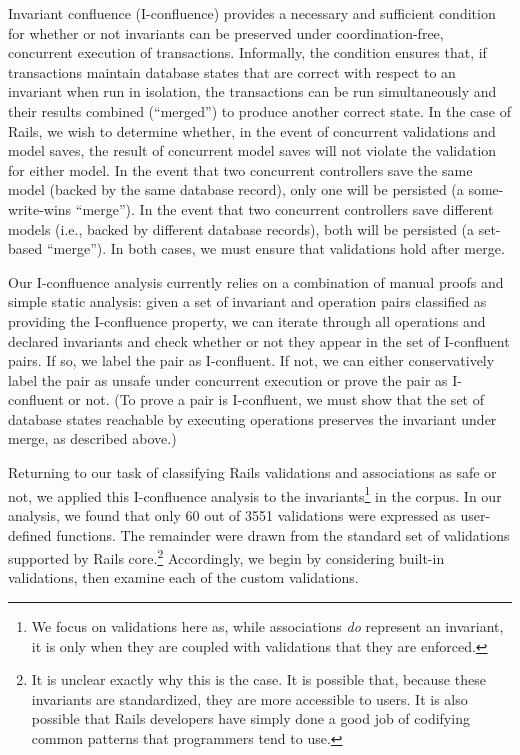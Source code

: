 Invariant confluence (I-confluence) provides a necessary and
sufficient condition for whether or not invariants can be preserved
under coordination-free, concurrent execution of
transactions. Informally, the condition ensures that, if transactions
maintain database states that are correct with respect to an invariant
when run in isolation, the transactions can be run simultaneously and
their results combined (``merged'') to produce another correct
state. In the case of Rails, we wish to determine whether, in the
event of concurrent validations and model saves, the result of
concurrent model saves will not violate the validation for either
model. In the event that two concurrent controllers save the same
model (backed by the same database record), only one will be persisted
(a some-write-wins ``merge''). In the event that two concurrent
controllers save different models (i.e., backed by different database
records), both will be persisted (a set-based ``merge''). In both
cases, we must ensure that validations hold after merge.

Our I-confluence analysis currently relies on a combination of manual
proofs and simple static analysis: given a set of invariant and
operation pairs classified as providing the I-confluence property, we
can iterate through all operations and declared invariants and check
whether or not they appear in the set of I-confluent pairs. If so, we
label the pair as I-confluent. If not, we can either conservatively
label the pair as unsafe under concurrent execution or prove the pair
as I-confluent or not. (To prove a pair is I-confluent, we must show
that the set of database states reachable by executing operations
preserves the invariant under merge, as described above.)

Returning to our task of classifying Rails validations and
associations as safe or not, we applied this I-confluence analysis to
the invariants\footnote{We focus on validations here as, while
  associations \textit{do} represent an invariant, it is only when
  they are coupled with validations that they are enforced.} in the
corpus. In our analysis, we
found that only 60 out of 3551 validations were expressed as
user-defined functions. The remainder were drawn from the standard set
of validations supported by Rails core.\footnote{It is unclear exactly
  why this is the case. It is possible that, because these invariants
  are standardized, they are more accessible to users. It is also
  possible that Rails developers have simply done a good job of
  codifying common patterns that programmers tend to use.}
Accordingly, we begin by considering built-in validations, then
examine each of the custom validations.


